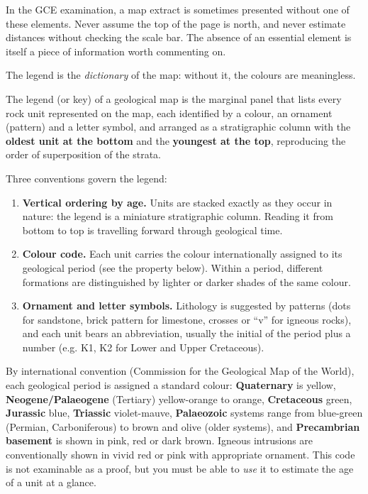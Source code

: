 \documentclass[11pt]{article}
\newcommand{\cle}[1]{{\popxbold\color{popdark}#1}}
\newcounter{popsec}
\newcounter{popsub}
\newcommand{\courssub}[1]{%
  \stepcounter{popsub}%
  \par\vspace{9pt}\noindent{\popxbold\fontsize{11.5}{13}\selectfont\color{popink}{\color{poporange}\thepopsec.\thepopsub}\hspace{6pt}#1}\par\nopagebreak\vspace{4pt}
}
\begin{document}
\begin{attention}
In the GCE examination, a map extract is sometimes presented without one of these elements. Never assume the top of the page is north, and never estimate distances without checking the scale bar. The absence of an essential element is itself a piece of information worth commenting on.
\end{attention}

\courssub{The Legend (Key) of a Geological Map}

The legend is the \emph{dictionary} of the map: without it, the colours are meaningless.

\begin{definition}
The \cle{legend} (or \cle{key}) of a geological map is the marginal panel that lists every rock unit represented on the map, each identified by a colour, an ornament (pattern) and a letter symbol, and arranged as a \cle{stratigraphic column} with the \textbf{oldest unit at the bottom} and the \textbf{youngest at the top}, reproducing the order of superposition of the strata.
\end{definition}

Three conventions govern the legend:

\begin{enumerate}
\item \textbf{Vertical ordering by age.} Units are stacked exactly as they occur in nature: the legend is a miniature stratigraphic column. Reading it from bottom to top is travelling forward through geological time.
\item \textbf{Colour code.} Each unit carries the colour internationally assigned to its geological period (see the property below). Within a period, different formations are distinguished by lighter or darker shades of the same colour.
\item \textbf{Ornament and letter symbols.} Lithology is suggested by patterns (dots for sandstone, brick pattern for limestone, crosses or ``v'' for igneous rocks), and each unit bears an abbreviation, usually the initial of the period plus a number (e.g. K1, K2 for Lower and Upper Cretaceous).
\end{enumerate}

\begin{propriete}
By international convention (Commission for the Geological Map of the World), each geological period is assigned a standard colour: \textbf{Quaternary} is yellow, \textbf{Neogene/Palaeogene} (Tertiary) yellow-orange to orange, \textbf{Cretaceous} green, \textbf{Jurassic} blue, \textbf{Triassic} violet-mauve, \textbf{Palaeozoic} systems range from blue-green (Permian, Carboniferous) to brown and olive (older systems), and \textbf{Precambrian basement} is shown in pink, red or dark brown. Igneous intrusions are conventionally shown in vivid red or pink with appropriate ornament. This code is not examinable as a proof, but you must be able to \emph{use} it to estimate the age of a unit at a glance.
\end{propriete}
\end{document}
